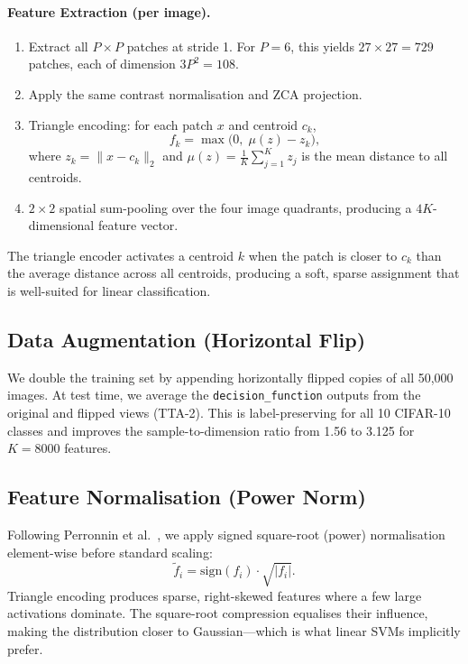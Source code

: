 \documentclass[11pt,a4paper]{article}
\begin{document}
\paragraph{Feature Extraction (per image).}
\begin{enumerate}[nosep]
  \item Extract all $P \times P$ patches at stride 1.  For $P = 6$, this
        yields $27 \times 27 = 729$ patches, each of dimension $3P^2 = 108$.
  \item Apply the same contrast normalisation and ZCA projection.
  \item Triangle encoding: for each patch $x$ and centroid $c_k$,
        \[
          f_k = \max\!\bigl(0,\;\mu(z) - z_k\bigr),
        \]
        where $z_k = \|x - c_k\|_2$ and $\mu(z) = \frac{1}{K}\sum_{j=1}^{K} z_j$
        is the mean distance to all centroids.
  \item $2 \times 2$ spatial sum-pooling over the four image quadrants,
        producing a $4K$-dimensional feature vector.
\end{enumerate}

The triangle encoder activates a centroid $k$ when the patch is closer to $c_k$
than the average distance across all centroids, producing a soft, sparse
assignment that is well-suited for linear classification.

\subsection{Data Augmentation (Horizontal Flip)}
\label{sec:augmentation}

We double the training set by appending horizontally flipped copies of all
50,000 images.  At test time, we average the \texttt{decision\_function}
outputs from the original and flipped views (TTA-2).  This is label-preserving
for all 10 CIFAR-10 classes and improves the sample-to-dimension ratio from
1.56 to 3.125 for $K = 8000$ features.

\subsection{Feature Normalisation (Power Norm)}
\label{sec:powernorm}

Following Perronnin et al.~\cite{perronnin2010improving}, we apply signed
square-root (power) normalisation element-wise before standard scaling:
\[
  \tilde{f}_i = \mathrm{sign}(f_i) \cdot \sqrt{|f_i|}.
\]
Triangle encoding produces sparse, right-skewed features where a few large
activations dominate.  The square-root compression equalises their influence,
making the distribution closer to Gaussian---which is what linear SVMs
implicitly prefer.
\end{document}
